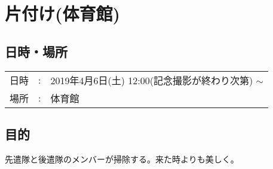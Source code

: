 
%

\section{片付け(体育館)}
\subsection{日時・場所}
\begin{tabular}{p{}rp{}}
  日時 & : & 2019年4月6日(土) 12:00(記念撮影が終わり次第) $\sim$\\
  場所 & : & 体育館
\end{tabular}

\subsection{目的}
先遣隊と後遣隊のメンバーが掃除する。来た時よりも美しく。


